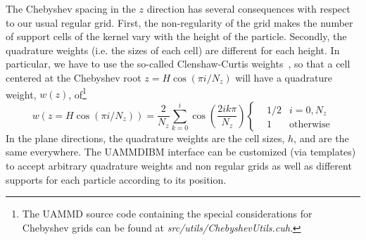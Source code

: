 \documentclass[ twoside,openright,titlepage,numbers=noenddot,%
headinclude,footinclude,cleardoublepage=empty,abstract=on,
BCOR=5mm,paper=b5,fontsize=11pt, dvipsnames
]{scrreprt}
\newcommand{\uammd}{\gls{UAMMD}\xspace}
\begin{document}
The Chebyshev spacing in the $z$ direction has several consequences with respect to our usual regular grid. First, the non-regularity of the grid makes the number of support cells of the kernel vary with the height of the particle. Secondly, the quadrature weights (i.e. the sizes of each cell) are different for each height. In particular, we have to use the so-called Clenshaw-Curtis weights~\cite{Clenshaw1960}, so that a cell centered at the Chebyshev root $z = H\cos(\pi i/N_z)$ will have a quadrature weight, $w(z)$, of\footnote{The \uammd source code containing the special considerations for Chebyshev grids can be found at \emph{src/utils/ChebyshevUtils.cuh}.}
\begin{equation}
  \label{eq:clencurt}
  w(z=H\cos(\pi i/N_z)) = \frac{2}{N_z}\sum_{k=0}^i\cos\left(\frac{2ik\pi}{N_z}\right)\left\{
  \begin{aligned}
    &1/2 & i=0,N_z\\
    & 1 & \textrm{otherwise}
  \end{aligned}\right.
\end{equation}
In the plane directions, the quadrature weights are the cell sizes, $h$, and are the same everywhere.
The \uammd \gls{IBM} interface can be customized (via templates) to accept arbitrary quadrature weights and non regular grids as well as different supports for each particle according to its position.
\end{document}

